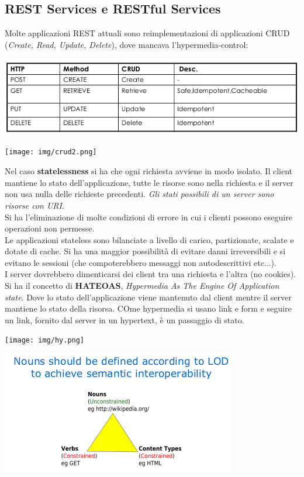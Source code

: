\documentclass[a4paper,12pt, oneside]{book}
\begin{document}
\subsection{REST Services e RESTful Services}
Molte applicazioni REST attuali sono reimplementazioni di applicazioni CRUD (\textit{Create, Read, Update, Delete}), dove mancava l'hypermedia-control:
\begin{center}
\includegraphics[scale=0.6]{img/crud.png}
\end{center}
\begin{center}
\texttt{[image: img/crud2.png]}
\end{center}
Nel caso \textbf{statelessness} si ha che ogni richiesta avviene in modo isolato.
Il client mantiene lo stato dell'applicazione, tutte le risorse sono nella richiesta
e il server non usa nulla delle richieste precedenti. \textit{Gli stati possibili di un server sono risorse con URI}.\\
Si ha l'eliminazione di molte condizioni di errore in cui i clienti possono eseguire
operazioni non permesse.\\
Le applicazioni stateless sono bilanciate a livello di carico, partizionate, scalate e dotate di cache. Si ha una maggior possibilità di evitare danni irreversibili e si evitano
le sessioni (che compoterebbero messaggi non autodescrittivi etc...).\\
I server dovrebbero dimenticarsi dei client tra una richiesta e l'altra (no cookies).\\
Si ha il concetto di \textbf{HATEOAS}, \textit{Hypermedia As The Engine Of Application state}.
Dove lo stato dell'applicazione viene mantenuto dal client mentre il server mantiene
lo stato della risorsa. COme hypermedia si usano link e form e seguire un link, fornito dal server in un hypertext, è un passaggio di stato.
\begin{center}
\texttt{[image: img/hy.png]}
\end{center}
\begin{center}
\includegraphics[scale=0.7]{img/bho.png}
\end{center}
\end{document}
